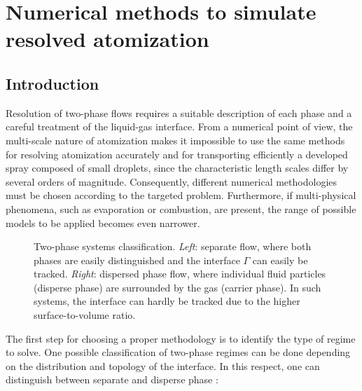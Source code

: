 \chapter{Numerical methods to simulate resolved atomization}
	\label{ch2:numerical_methods_resolved_atomization}

\section{Introduction}


Resolution of two-phase flows requires a suitable description of each phase and a careful treatment of the liquid-gas interface. From a numerical point of view, the multi-scale nature of atomization makes it impossible to use the same methods for resolving atomization accurately and for transporting efficiently a developed spray composed of small droplets, since the characteristic length scales differ by several orders of magnitude. Consequently, different numerical methodologies must be chosen according to the targeted problem. Furthermore, if multi-physical phenomena, such as evaporation or combustion, are present, the range of possible models to be applied becomes even narrower.

\begin{figure}[h!]	
	\centering
{}
	\caption[Two-phase systems classification]{Two-phase systems classification. \textsl{Left}: separate flow, where both phases are easily distinguished and the interface $\Gamma$ can easily be tracked. \textsl{Right}: dispersed phase flow, where individual fluid particles (disperse phase) are surrounded by the gas (carrier phase). In such systems, the interface can hardly be tracked due to the higher surface-to-volume ratio.}
	\label{fig:TPF_droplets_example}
\end{figure}

The first step for choosing a proper methodology is to identify the type of regime to solve. One possible classification of two-phase regimes can be done depending on the distribution and topology of the interface. In this respect, one can distinguish between separate and disperse phase : 



